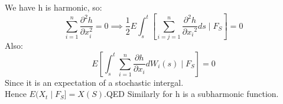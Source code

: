\documentclass[12pt]{article}
\begin{document}
We have h is harmonic, so:\\
$$\sum_{i=1}^n \frac{\partial^2 h}{\partial x_i^2} = 0 \implies \frac{1}{2} E\int_s^t \left[\sum_{i=j=1}^n\frac{\partial^2h}{\partial {x_i}^2}ds \mid F_S \right] = 0$$
Also:\\
 $$E\left[ \int_s^t \sum_{i=1}^n \frac{\partial h}{\partial x_i}dW_i(s)\mid F_S \right] = 0$$ Since it is an expectation of a stochastic intergal.\\
 Hence $E(X_t \mid F_S] = X(S)$.QED
 Similarly for h is a subharmonic function.
 


    
\end{document}
